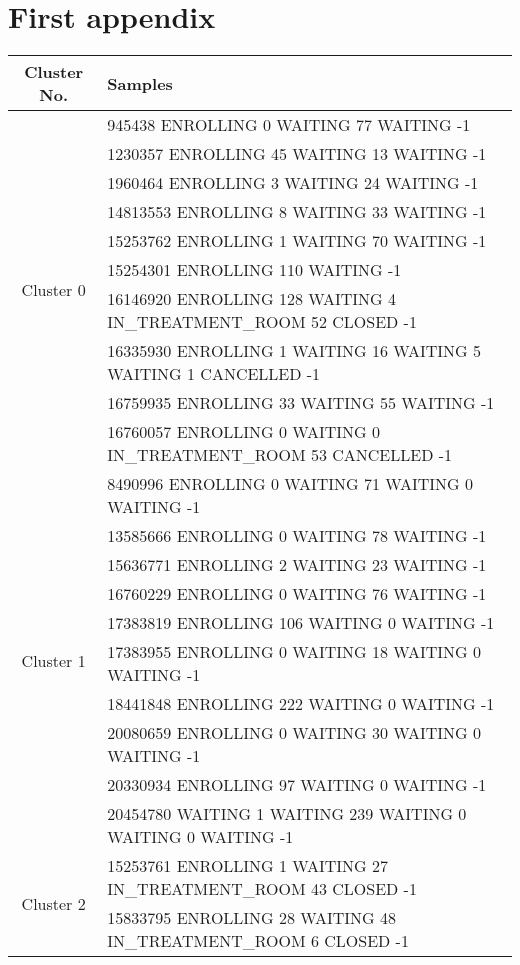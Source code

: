 \chapter{First appendix}
\label{chapter:first-appendix}

{\scriptsize
\begin{longtable}{|c|p{}|}
		\hline
		Cluster No. & Samples \\
		\hline
		\multirow{10}{*}{Cluster 0}
		& 945438 ENROLLING 0 WAITING 77 WAITING -1 \\
		& 1230357 ENROLLING 45 WAITING 13 WAITING -1 \\
		& 1960464 ENROLLING 3 WAITING 24 WAITING -1 \\
		& 14813553 ENROLLING 8 WAITING 33 WAITING -1 \\
		& 15253762 ENROLLING 1 WAITING 70 WAITING -1 \\
		& 15254301 ENROLLING 110 WAITING -1 \\
		& 16146920 ENROLLING 128 WAITING 4 IN\_TREATMENT\_ROOM 52 CLOSED -1 \\
		& 16335930 ENROLLING 1 WAITING 16 WAITING 5 WAITING 1 CANCELLED -1 \\
		& 16759935 ENROLLING 33 WAITING 55 WAITING -1 \\
		& 16760057 ENROLLING 0 WAITING 0 IN\_TREATMENT\_ROOM 53 CANCELLED -1 \\
		\hline
		\multirow{10}{*}{Cluster 1}
		& 8490996 ENROLLING 0 WAITING 71 WAITING 0 WAITING -1 \\
		& 13585666 ENROLLING 0 WAITING 78 WAITING -1 \\
		& 15636771 ENROLLING 2 WAITING 23 WAITING -1 \\
		& 16760229 ENROLLING 0 WAITING 76 WAITING -1 \\
		& 17383819 ENROLLING 106 WAITING 0 WAITING -1 \\
		& 17383955 ENROLLING 0 WAITING 18 WAITING 0 WAITING -1 \\
		& 18441848 ENROLLING 222 WAITING 0 WAITING -1 \\
		& 20080659 ENROLLING 0 WAITING 30 WAITING 0 WAITING -1 \\
		& 20330934 ENROLLING 97 WAITING 0 WAITING -1 \\
		& 20454780 WAITING 1 WAITING 239 WAITING 0 WAITING 0 WAITING -1 \\
		\hline
		\multirow{10}{*}{Cluster 2}
		& 15253761 ENROLLING 1 WAITING 27 IN\_TREATMENT\_ROOM 43 CLOSED -1 \\
		& 15833795 ENROLLING 28 WAITING 48 IN\_TREATMENT\_ROOM 6 CLOSED -1 \\

\end{longtable}}
